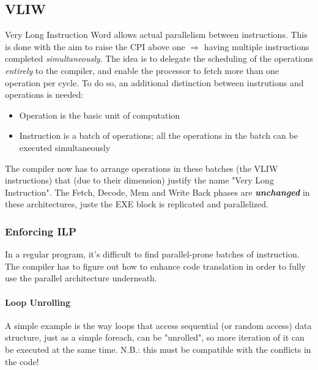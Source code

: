 \documentclass[10pt,a4paper]{article}
\begin{document}
			\subsection{VLIW}
				Very Long Instruction Word allows actual parallelism between instructions. This is done with the aim to raise the CPI above one $\Rightarrow$ having multiple instructions completed \emph{simultaneously}. The idea is to delegate the scheduling of the operations \emph{entirely} to the compiler, and enable the processor to fetch more than one operation per cycle. To do so, an additional distinction between instrutions and operations is needed:
				\begin{itemize}
					\item Operation is the basic unit of computation
					\item Instruction is a batch of operations; all the operations in the batch can be executed simultaneously
				\end{itemize}
				The compiler now has to arrange operations in these batches (the VLIW instructions) that (due to their dimension) justify the name "Very Long Instruction". The Fetch, Decode, Mem and Write Back phases are \textbf{\emph{unchanged}} in these architectures, juste the EXE block is replicated and parallelized.
				
				\subsubsection{Enforcing ILP}
					In a regular program, it's difficult to find parallel-prone batches of instruction. The compiler has to figure out how to enhance code translation in order to fully use the parallel architecture underneath.
					
					\paragraph{Loop Unrolling}
						A simple example is the way loops that access sequential (or random access) data structure, just as a simple foreach, can be "unrolled", so more iteration of it can be executed at the same time. N.B.: this must be compatible with the conflicts in the code!
						
\end{document}
